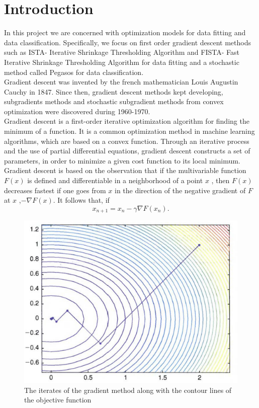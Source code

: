 \documentclass[12pt]{article}
\begin{document}
\section{Introduction}
In this project we are concerned with optimization models for data fitting and data classification. Specifically, we focus on first order gradient descent methods such as ISTA- Iterative Shrinkage Thresholding Algorithm and FISTA- Fast Iterative Shrinkage Thresholding Algorithm for data fitting and a stochastic method called Pegasos for data classification.\\
Gradient descent was invented by the french mathematician Louis Augustin Cauchy in 1847. Since then, gradient descent methods kept developing, subgradients methods and stochastic subgradient methods from convex optimization were discovered during 1960-1970.  \\
Gradient descent is a first-order iterative optimization algorithm for finding the minimum of a function. 
It is a common optimization method in machine learning algorithms, which are based on a convex function.
Through an iterative process and the use of partial differential equations, gradient descent constructs a set of parameters, in order to minimize a given cost function to its local minimum.\\
Gradient descent is based on the observation that if the multivariable function $F(x)$ is defined and differentiable in a neighborhood of a point $x$ , then $F(x)$ decreases fastest if one goes from $x$ in the direction of the negative gradient of $F$ at $x$ ,$-\nabla F(x)$. 
It follows that, if 
$$x_{n+1} = x_n -\gamma \nabla F(x_n). $$
\begin{figure}[H]
\centering
\includegraphics[scale=0.4]{gd.png}
\caption{The iterates of the gradient method along with the contour lines of the objective function}
\end{figure}
\end{document}
